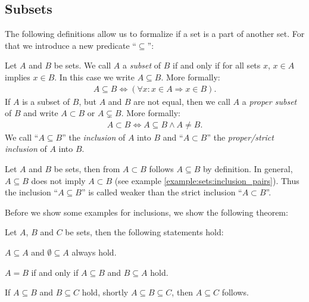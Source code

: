 \subsection{Subsets}

The following definitions allow us to formalize if a set is a part of another set. For that we introduce a new predicate \enquote{$\subseteq$}:

\begin{definition}
    Let $A$ and $B$ be sets. We call $A$ a \emph{subset} of $B$ if and only if for all sets $x$, $x\in A$ implies $x\in B$. In this case we write $A\subseteq B$. More formally:
    \begin{align}A\subseteq B\iff (\forall x\colon x\in A\Rightarrow x\in B).\end{align}
    If $A$ is a subset of $B$, but $A$ and $B$ are not equal, then we call $A$ a \emph{proper subset} of $B$ and write $A\subset B$ or $A\subsetneq B$. More formally:
    \begin{align}A\subset B\iff A\subseteq B\land A\neq B.\end{align}
    We call \enquote{$A\subseteq B$} the \emph{inclusion} of $A$ into $B$ and \enquote{$A\subset B$} the \emph{proper/strict inclusion} of $A$ into $B$.
\end{definition}

\begin{remarks}
    \begin{remarkenumerate}
        \item Let $A$ and $B$ be sets, then from $A\subset B$ follows $A\subseteq B$ by definition. In general, $A\subseteq B$ does not imply $A\subset B$ (see example \ref{example:sets:inclusion_pairs}). Thus the inclusion \enquote{$A\subseteq B$} is called weaker than the strict inclusion \enquote{$A\subset B$}.
    \end{remarkenumerate}
\end{remarks}

Before we show some examples for inclusions, we show the following theorem:

\begin{theorem}\label{theorem:sets:subset_partial_order}
    Let $A$, $B$ and $C$ be sets, then the following statements hold:
    \begin{intheoremenumerate}
        \item\label{theorem:sets:always_subsets} $A\subseteq A$ and $\emptyset\subseteq A$ always hold.
        \item\label{theorem:sets:subset_equals} $A=B$ if and only if $A\subseteq B$ and $B\subseteq A$ hold.
        \item\label{theorem:sets:subset_transitive} If $A\subseteq B$ and $B\subseteq C$ hold, shortly $A\subseteq B\subseteq C$, then $A\subseteq C$ follows.
    \end{intheoremenumerate}
\end{theorem}

